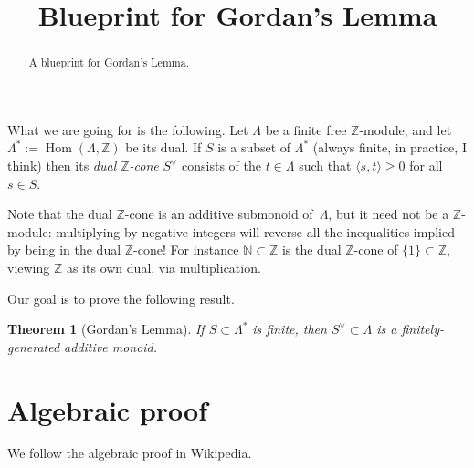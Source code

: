 \documentclass{amsart}
\newcommand{\N}{\mathbb{N}}
\newcommand{\Z}{\mathbb{Z}}
\DeclareMathOperator{\Hom}{Hom}
\newtheorem{theorem}{Theorem}
\begin{document}
\title[]{Blueprint for Gordan's Lemma}

\begin{abstract}
A blueprint for Gordan's Lemma.
\end{abstract}

\maketitle

What we are going for is the following. Let $\Lambda$ be a finite free $\Z$-module, and let $\Lambda^*:=\Hom(\Lambda,\Z)$ be its dual. If $S$ is a subset of $\Lambda^*$ (always finite, in practice, I think) then its \emph{dual $\Z$-cone} $S^\vee$ consists of the $t\in\Lambda$ such that $\langle s,t\rangle\geq0$ for all $s\in S$.

Note that the dual $\Z$-cone is an additive submonoid of~$\Lambda$, but it need not be a $\Z$-module: multiplying by negative integers will reverse all the inequalities implied by being in the dual $\Z$-cone!  For instance $\N \subset \Z$ is the dual $\Z$-cone of $\{1\} \subset \Z$, viewing $\Z$ as its own dual, via multiplication.

Our goal is to prove the following result.

\begin{theorem}[Gordan's Lemma]
If $S \subset \Lambda^*$ is finite, then $S^\vee \subset \Lambda$ is a finitely-generated additive monoid.
\end{theorem}

\section{Algebraic proof}

We follow the algebraic proof in Wikipedia.
\end{document}
